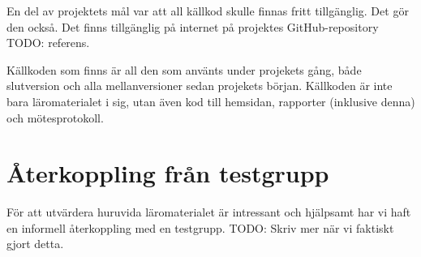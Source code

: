 \begin{binge}
En del av projektets mål var att all källkod skulle finnas fritt tillgänglig. Det gör den också. Det finns tillgänglig på internet på projektes GitHub-repository TODO: referens.

Källkoden som finns är all den som använts under projekets gång, både slutversion och alla mellanversioner sedan projekets början. Källkoden är inte bara läromaterialet i sig, utan även kod till hemsidan, rapporter (inklusive denna) och mötesprotokoll.

\section{Återkoppling från testgrupp}

För att utvärdera huruvida läromaterialet är intressant och hjälpsamt har vi haft en informell återkoppling med en testgrupp. TODO: Skriv mer när vi faktiskt gjort detta.

\end{binge}
